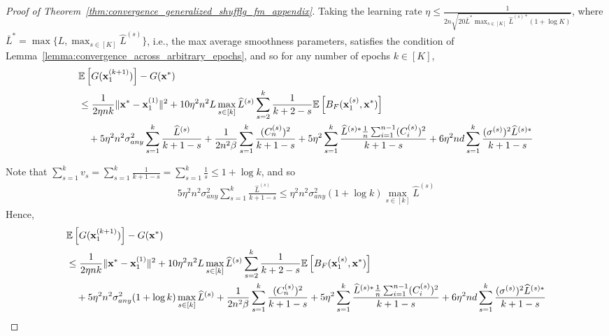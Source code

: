 \begin{proof}[Proof of Theorem~\ref{thm:convergence_generalized_shufflg_fm_appendix}]
    Taking the learning rate $\eta \leq \frac{1}{2n \sqrt{20 \bar{L}^* \max_{s\in [K]}\widehat{L}^{(s)*} (1+\log K)}}$, 
    where $\bar{L}^* = \max\{L, \max_{s\in[K]} \widehat{L}^{(s)}\}$, i.e., the max average smoothness parameters, satisfies the condition of Lemma~\ref{lemma:convergence_across_arbitrary_epochs}, and so for any number of epochs $k\in [K]$,
    \begin{align}
        &\mathbb{E}\left[G({\mathbf{x}}_1^{(k+1)})\right] - G({\mathbf{x}}^*)\\
        \nonumber
        &\leq \frac{1}{2\eta n k} \| {\mathbf{x}}^* - {\mathbf{x}}_1^{(1)}\|^2
        + 10 \eta^2 n^2 L\max_{s\in[k]}\widehat{L}^{(s)} \sum_{s=2}^{k} \frac{1}{k+2-s} \mathbb{E}\left[B_F({\mathbf{x}}_1^{(s)}, {\mathbf{x}}^*)\right]\\
        \nonumber
        &\quad + 5\eta^2 n^2 \sigma_{any}^2 \sum_{s=1}^{k} \frac{ \widehat{L}^{(s)} }{k+1-s}
        + \frac{1}{2n^2 \beta}\sum_{s=1}^{k} \frac{ (C_n^{(s)})^2 }{k+1-s}
        + 5\eta^2 \sum_{s=1}^{k} \frac{ \widehat{L}^{(s)*} \frac{1}{n}\sum_{i=1}^{n-1}(C_i^{(s)})^2} {k+1-s}
        + 6\eta^2 nd \sum_{s=1}^{k} \frac{ (\sigma^{(s)})^2 \widehat{L}^{(s)*} }{k+1-s}
    \end{align}

    Note that $\sum_{s=1}^{k} v_s = \sum_{s=1}^{k} \frac{1}{k+1-s} = \sum_{s=1}^{k} \frac{1}{s}\leq 1+\log k$, and so
    \begin{align*}
        5 \eta^2 n^2 \sigma_{any}^2 \sum_{s=1}^{k} \frac{\widehat{L}^{(s)}}{k+1-s}
        \leq \eta^2 n^2 \sigma_{any}^2  (1+\log k) \max_{s\in [k]} \widehat{L}^{(s)}
    \end{align*}
    Hence,
    \begin{align}
        &\mathbb{E}\left[G({\mathbf{x}}_1^{(k+1)})\right] - G({\mathbf{x}}^*) \\
        \nonumber
        &\leq \frac{1}{2\eta n k}  \| {\mathbf{x}}^* - {\mathbf{x}}_1^{(1)}\|^2 
        + 10 \eta^2 n^2 L\max_{s\in[k]}\widehat{L}^{(s)} \sum_{s=2}^{k} \frac{1}{k+2-s} \mathbb{E}\left[B_F({\mathbf{x}}_1^{(s)}, {\mathbf{x}}^*)\right]\\
        \nonumber
        &\quad + 5\eta^2 n^2 \sigma_{any}^2 (1+\log k) \max_{s\in [k]}\widehat{L}^{(s)}
        + \frac{1}{2n^2 \beta}\sum_{s=1}^{k} \frac{ (C_n^{(s)})^2 }{k+1-s}
        + 5\eta^2 \sum_{s=1}^{k} \frac{ \widehat{L}^{(s)*} \frac{1}{n}\sum_{i=1}^{n-1}(C_i^{(s)})^2} {k+1-s}
        + 6\eta^2 nd \sum_{s=1}^{k} \frac{ (\sigma^{(s)})^2 \widehat{L}^{(s)*} }{k+1-s}
    \end{align}


\end{proof}
